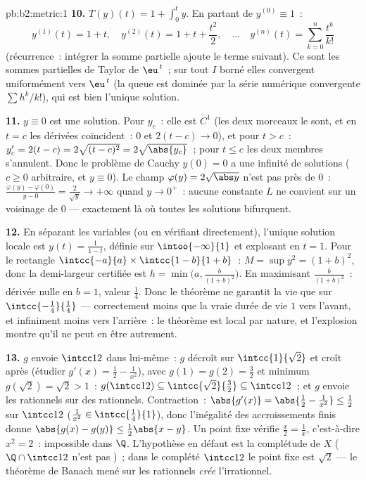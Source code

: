 \begin{solution}{pb:b2:metric:1}
\textbf{10.} $T(y)(t) = 1 + \int_0^t y$. En partant de $y^{(0)}
\equiv 1$~:
\[
y^{(1)}(t) = 1 + t,\quad
y^{(2)}(t) = 1 + t + \frac{t^2}2,\quad\dots\quad
y^{(n)}(t) = \sum_{k=0}^{n}\frac{t^k}{k!}
\]
(récurrence~: intégrer la somme partielle ajoute le terme suivant).
Ce sont les sommes partielles de Taylor de $\eu^{\,t}$~; sur tout $I$
borné elles convergent uniformément vers $\eu^{\,t}$ (la queue est
dominée par la série numérique convergente $\sum h^k/k!$), qui est
bien l'unique solution.

\textbf{11.} $y \equiv 0$ est une solution. Pour $y_c$~: elle est
$C^1$ (les deux morceaux le sont, et en $t = c$ les dérivées
coïncident~: $0$ et $2(t - c) \to 0$), et pour $t > c$~: $y_c' = 2(t
- c) = 2\sqrt{(t-c)^2} = 2\sqrt{\abs{y_c}}$~; pour $t \leq c$ les
deux membres s'annulent. Donc le problème de Cauchy $y(0) = 0$ a une
infinité de solutions ($c \geq 0$ arbitraire, et $y \equiv 0$). Le
champ $\varphi(y) = 2\sqrt{\abs y}$ n'est pas  près de
$0$~: $\frac{\varphi(y) - \varphi(0)}{y - 0} = \frac{2}{\sqrt y} \to
+\infty$ quand $y \to 0^+$~: aucune constante $L$ ne convient sur un
voisinage de $0$ --- exactement là où toutes les solutions
bifurquent.

\textbf{12.} En séparant les variables (ou en vérifiant
directement), l'unique solution locale est $y(t) = \frac1{1 - t}$,
définie sur $\intoo{-\infty}{1}$ et explosant en $t = 1$. Pour le
rectangle $\intcc{-a}{a} \times \intcc{1 - b}{1 + b}$~: $M = \sup y^2
= (1 + b)^2$, donc la demi-largeur certifiée est $h =
\min\bigl(a, \frac{b}{(1+b)^2}\bigr)$. En maximisant
$\frac{b}{(1+b)^2}$~: dérivée nulle en $b = 1$, valeur $\frac14$.
Donc le théorème ne garantit la vie que sur
$\intcc{-\frac14}{\frac14}$ --- correctement moins que la vraie durée
de vie $1$ vers l'avant, et infiniment moins vers l'arrière~: le
théorème est local par nature, et l'explosion montre qu'il ne peut en
être autrement.

\textbf{13.} $g$ envoie $\intcc12$ dans lui-même~: $g$ décroît sur
$\intcc{1}{\sqrt2}$ et croît après (étudier $g'(x) = \frac12 -
\frac1{x^2}$), avec $g(1) = g(2) = \frac32$ et minimum $g(\sqrt2) =
\sqrt2 > 1$~: $g(\intcc12) \subseteq \intcc{\sqrt2}{\frac32}
\subseteq \intcc12$~; et $g$ envoie les rationnels sur des
rationnels. Contraction~: $\abs{g'(x)} = \abs{\frac12 - \frac1{x^2}}
\leq \frac12$ sur $\intcc12$ ($\frac1{x^2} \in
\intcc{\frac14}{1}$), donc l'inégalité des accroissements finis donne
$\abs{g(x) - g(y)} \leq \frac12\abs{x - y}$. Un point fixe vérifie
$\frac x2 = \frac1x$, c'est-à-dire $x^2 = 2$~: impossible dans $\Q$.
L'hypothèse en défaut est la complétude de $X$ ($\Q \cap \intcc12$
n'est pas )~; dans le complété $\intcc12$ le point fixe est
$\sqrt2$ --- le théorème de Banach mené sur les rationnels
\emph{crée} l'irrationnel.


\end{solution}
